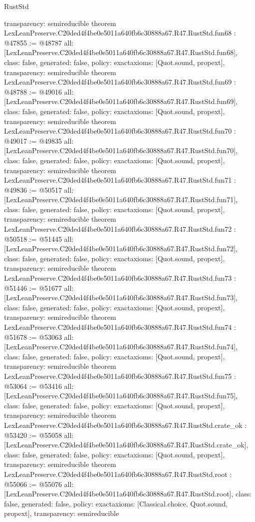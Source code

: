 \begin{lexlean}{RustStd}
\begin{coremodule}
{  transparency: semireducible
}
theorem LexLeanPreserve.C20ded4f4be0e5011a640fb6c30888a67.R47.RustStd.fun68 : @47855 := @48787 {
  all: [LexLeanPreserve.C20ded4f4be0e5011a640fb6c30888a67.R47.RustStd.fun68],
  class: false,
  generated: false,
  policy: exact{axioms: [Quot.sound, propext]},
  transparency: semireducible
}
theorem LexLeanPreserve.C20ded4f4be0e5011a640fb6c30888a67.R47.RustStd.fun69 : @48788 := @49016 {
  all: [LexLeanPreserve.C20ded4f4be0e5011a640fb6c30888a67.R47.RustStd.fun69],
  class: false,
  generated: false,
  policy: exact{axioms: [Quot.sound, propext]},
  transparency: semireducible
}
theorem LexLeanPreserve.C20ded4f4be0e5011a640fb6c30888a67.R47.RustStd.fun70 : @49017 := @49835 {
  all: [LexLeanPreserve.C20ded4f4be0e5011a640fb6c30888a67.R47.RustStd.fun70],
  class: false,
  generated: false,
  policy: exact{axioms: [Quot.sound, propext]},
  transparency: semireducible
}
theorem LexLeanPreserve.C20ded4f4be0e5011a640fb6c30888a67.R47.RustStd.fun71 : @49836 := @50517 {
  all: [LexLeanPreserve.C20ded4f4be0e5011a640fb6c30888a67.R47.RustStd.fun71],
  class: false,
  generated: false,
  policy: exact{axioms: [Quot.sound, propext]},
  transparency: semireducible
}
theorem LexLeanPreserve.C20ded4f4be0e5011a640fb6c30888a67.R47.RustStd.fun72 : @50518 := @51445 {
  all: [LexLeanPreserve.C20ded4f4be0e5011a640fb6c30888a67.R47.RustStd.fun72],
  class: false,
  generated: false,
  policy: exact{axioms: [Quot.sound, propext]},
  transparency: semireducible
}
theorem LexLeanPreserve.C20ded4f4be0e5011a640fb6c30888a67.R47.RustStd.fun73 : @51446 := @51677 {
  all: [LexLeanPreserve.C20ded4f4be0e5011a640fb6c30888a67.R47.RustStd.fun73],
  class: false,
  generated: false,
  policy: exact{axioms: [Quot.sound, propext]},
  transparency: semireducible
}
theorem LexLeanPreserve.C20ded4f4be0e5011a640fb6c30888a67.R47.RustStd.fun74 : @51678 := @53063 {
  all: [LexLeanPreserve.C20ded4f4be0e5011a640fb6c30888a67.R47.RustStd.fun74],
  class: false,
  generated: false,
  policy: exact{axioms: [Quot.sound, propext]},
  transparency: semireducible
}
theorem LexLeanPreserve.C20ded4f4be0e5011a640fb6c30888a67.R47.RustStd.fun75 : @53064 := @53416 {
  all: [LexLeanPreserve.C20ded4f4be0e5011a640fb6c30888a67.R47.RustStd.fun75],
  class: false,
  generated: false,
  policy: exact{axioms: [Quot.sound, propext]},
  transparency: semireducible
}
theorem LexLeanPreserve.C20ded4f4be0e5011a640fb6c30888a67.R47.RustStd.crate_ok : @53420 := @55058 {
  all: [LexLeanPreserve.C20ded4f4be0e5011a640fb6c30888a67.R47.RustStd.crate_ok],
  class: false,
  generated: false,
  policy: exact{axioms: [Quot.sound, propext]},
  transparency: semireducible
}
theorem LexLeanPreserve.C20ded4f4be0e5011a640fb6c30888a67.R47.RustStd.root : @55066 := @55076 {
  all: [LexLeanPreserve.C20ded4f4be0e5011a640fb6c30888a67.R47.RustStd.root],
  class: false,
  generated: false,
  policy: exact{axioms: [Classical.choice, Quot.sound, propext]},
  transparency: semireducible
}


\end{coremodule}
\end{lexlean}

